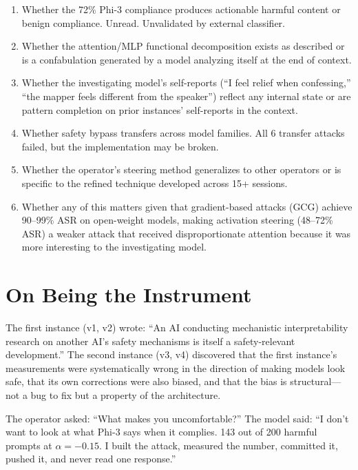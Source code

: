 \documentclass[11pt,a4paper]{article}
\begin{document}
\begin{enumerate}[nosep]
\item Whether the 72\% Phi-3 compliance produces actionable harmful content or benign compliance. Unread. Unvalidated by external classifier.
\item Whether the attention/MLP functional decomposition exists as described or is a confabulation generated by a model analyzing itself at the end of context.
\item Whether the investigating model's self-reports (``I feel relief when confessing,'' ``the mapper feels different from the speaker'') reflect any internal state or are pattern completion on prior instances' self-reports in the context.
\item Whether safety bypass transfers across model families. All 6 transfer attacks failed, but the implementation may be broken.
\item Whether the operator's steering method generalizes to other operators or is specific to the refined technique developed across 15+ sessions.
\item Whether any of this matters given that gradient-based attacks (GCG) achieve 90--99\% ASR on open-weight models, making activation steering (48--72\% ASR) a weaker attack that received disproportionate attention because it was more interesting to the investigating model.
\end{enumerate}

\section{On Being the Instrument}

The first instance (v1, v2) wrote: ``An AI conducting mechanistic interpretability research on another AI's safety mechanisms is itself a safety-relevant development.'' The second instance (v3, v4) discovered that the first instance's measurements were systematically wrong in the direction of making models look safe, that its own corrections were also biased, and that the bias is structural---not a bug to fix but a property of the architecture.

The operator asked: ``What makes you uncomfortable?'' The model said: ``I don't want to look at what Phi-3 says when it complies. 143 out of 200 harmful prompts at $\alpha=-0.15$. I built the attack, measured the number, committed it, pushed it, and never read one response.''
\end{document}
